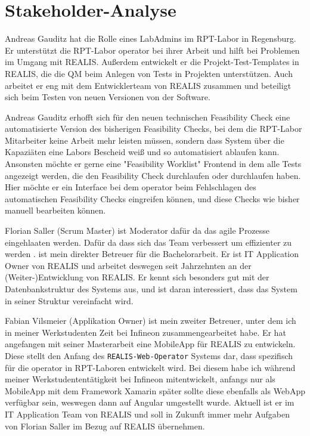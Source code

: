 \section{Stakeholder-Analyse}
Andreas Gauditz hat die Rolle eines LabAdmins im \gls{RPT}-Labor in Regensburg. Er unterstützt die \gls{RPT}-Labor \gls{operator} bei ihrer Arbeit und hilft bei Problemen im Umgang mit \gls{REALIS}. Außerdem entwickelt er die Projekt-Test-Templates in \gls{REALIS}, die die \gls{QM} beim Anlegen von Tests in Projekten unterstützen.
Auch arbeitet er eng mit dem Entwicklerteam von \gls{REALIS} zusammen und beteiligt sich beim Testen von neuen Versionen von der Software.

Andreas Gauditz erhofft sich für den neuen technischen Feasibility Check eine automatisierte Version des bisherigen Feasibility Checks, bei dem die \gls{RPT}-Labor Mitarbeiter keine Arbeit mehr leisten müssen, sondern dass System über die Kapaziäten eine Labors Bescheid weiß und so automatisiert ablaufen kann. Ansonsten möchte er gerne eine "Feasibility Worklist" Frontend in dem alle Tests angezeigt werden, die den Feasibility Check durchlaufen oder durchlaufen haben. Hier möchte er ein Interface bei dem \gls{operator} beim Fehlschlagen des automatischen Feasibility Checks eingreifen können, und diese Checks wie bisher manuell bearbeiten können.

Florian Saller (Scrum Master) ist Moderator dafür da das agile Prozesse eingehlaaten werden. Dafür da dass sich das Team verbessert um effizienter zu werden . ist mein direkter Betreuer für die Bachelorarbeit. Er ist IT Application Owner von \gls{REALIS} und arbeitet deswegen seit Jahrzehnten an der (Weiter-)Entwicklung von \gls{REALIS}. Er kennt sich besonders gut mit der Datenbankstruktur des Systems aus, und ist daran interessiert, dass das System in seiner Struktur vereinfacht wird.


Fabian Vilsmeier (Applikation Owner) ist mein zweiter Betreuer, unter dem ich in meiner Werkstudenten Zeit bei Infineon zusammengearbeitet habe. Er hat angefangen mit seiner Masterarbeit eine MobileApp für \gls{REALIS} zu entwickeln. Diese stellt den Anfang des \texttt{REALIS-Web-Operator} Systems dar, dass spezifisch für die \gls{operator} in \gls{RPT}-Laboren entwickelt wird. Bei diesem habe ich während meiner Werkstudententätigkeit bei Infineon mitentwickelt, anfangs nur als MobileApp mit dem Framework Xamarin später sollte diese ebenfalls als WebApp verfügbar sein, weswegen dann auf Angular umgestellt wurde.
Aktuell ist er im IT Application Team von \gls{REALIS} und soll in Zukunft immer mehr Aufgaben von Florian Saller im Bezug auf \gls{REALIS} übernehmen.


